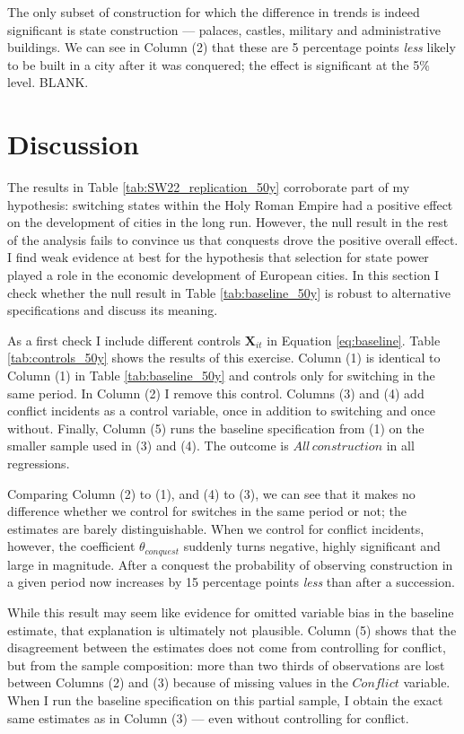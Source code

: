 \documentclass[11pt, a4paper]{article}
\begin{document}
The only subset of construction for which the difference in trends is indeed significant is state construction --- palaces, castles, military and administrative buildings. We can see in Column (2) that these are 5 percentage points \textit{less} likely to be built in a city after it was conquered; the effect is significant at the 5\% level. BLANK.



\section{Discussion} \label{sec:discussion}

The results in Table \ref{tab:SW22_replication_50y} corroborate part of my hypothesis: switching states within the Holy Roman Empire had a positive effect on the development of cities in the long run. However, the null result in the rest of the analysis fails to convince us that conquests drove the positive overall effect. I find weak evidence at best for the hypothesis that selection for state power played a role in the economic development of European cities. In this section I check whether the null result in Table \ref{tab:baseline_50y} is robust to alternative specifications and discuss its meaning.

As a first check I include different controls $\textbf{X}_{it}$ in Equation \eqref{eq:baseline}. Table \ref{tab:controls_50y} shows the results of this exercise. Column (1) is identical to Column (1) in Table \ref{tab:baseline_50y} and controls only for switching in the same period. In Column (2) I remove this control. Columns (3) and (4) add conflict incidents as a control variable, once in addition to switching and once without. Finally, Column (5) runs the baseline specification from (1) on the smaller sample used in (3) and (4). The outcome is $All \, construction$ in all regressions. 

Comparing Column (2) to (1), and (4) to (3), we can see that it makes no difference whether we control for switches in the same period or not; the estimates are barely distinguishable. When we control for conflict incidents, however, the coefficient $\theta_{conquest}$ suddenly turns negative, highly significant and large in magnitude. After a conquest the probability of observing construction in a given period now increases by 15 percentage points \textit{less} than after a succession.

While this result may seem like evidence for omitted variable bias in the baseline estimate, that explanation is ultimately not plausible. Column (5) shows that the disagreement between the estimates does not come from controlling for conflict, but from the sample composition: more than two thirds of observations are lost between Columns (2) and (3) because of missing values in the $Conflict$ variable. When I run the baseline specification on this partial sample, I obtain the exact same estimates as in Column (3) --- even without controlling for conflict.
\end{document}
